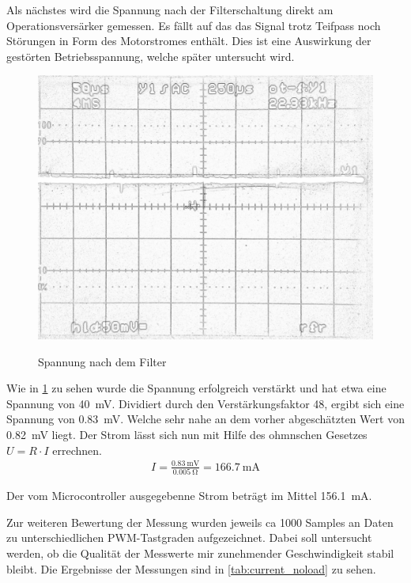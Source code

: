 Als nächstes wird die Spannung nach der Filterschaltung direkt am Operationsversärker gemessen. Es fällt auf das das Signal trotz Teifpass noch Störungen in Form des Motorstromes enthält.
Dies ist eine Auswirkung der gestörten Betriebsspannung, welche später untersucht wird.


\begin{figure}[H]
\centering
\includegraphics[width=.8\textwidth]{filter_ausgang.png}\\
\caption{Spannung nach dem Filter}%
\label{fig:filter_ausgang}
\end{figure}


Wie in \cref{fig:filter_ausgang} zu sehen wurde die Spannung erfolgreich verstärkt und hat etwa eine Spannung von \SI{40}{\mV}. Dividiert durch den Verstärkungsfaktor 48, ergibt sich eine Spannung von 
\SI{0,83}{\mV}. Welche sehr nahe an dem vorher abgeschätzten Wert von \SI{0,82}{\mV} liegt. Der Strom lässt sich nun mit Hilfe des ohmnschen Gesetzes $U=R\cdot I$ errechnen.
\begin{align*}
I=\frac{\SI{0,83}{\mV}}{\SI{0,005}{\ohm}}=\SI{166,7}{\mA}
\end{align*}

Der vom Microcontroller ausgegebenne Strom beträgt im Mittel \SI{156,1}{\mA}.

Zur weiteren Bewertung der Messung wurden jeweils ca 1000 Samples an Daten zu unterschiedlichen PWM-Tastgraden aufgezeichnet.
Dabei soll untersucht werden, ob die Qualität der Messwerte mir zunehmender Geschwindigkeit stabil bleibt.
Die Ergebnisse der Messungen sind in \cref{tab:current_noload} zu sehen.

